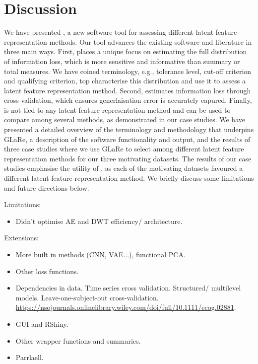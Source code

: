 \section{Discussion}\label{sec:discussion}

We have presented , a new software tool for assessing different latent feature representation methods.
Our tool advances the existing software and literature in three main ways.
First,  places a unique focus on estimating the full distribution of information loss, which is more sensitive and informative than summary or total measures.
We have coined terminology, e.g., tolerance level, cut-off criterion and qualifying criterion, top characterise this distribution and use it to assess a latent feature representation method.
Second,  estimates information loss through cross-validation, which ensures generlaisation error is accurately capured.
Finally,  is not tied to any latent feature representation method and can be used to compare among several methods, as demonstrated in our case studies.
We have presented a detailed overview of the terminology and methodology that underpins GLaRe, a description of the software functionality and output, and the results of three case studies where we use GLaRe to select among different latent feature representation methods for our three motivating datasets. 
The results of our case studies emphasise the utility of , as each of the motivating datasets favoured a different latent feature representation method.
We briefly discuss some limitations and future directions below.


Limitations:
\begin{itemize}
    \item Didn't optimise AE and DWT efficiency/ architecture.
\end{itemize}

Extensions:
\begin{itemize}
    \item More built in methods (CNN, VAE...), functional PCA.
    \item Other loss functions.
    \item Dependencies in data. Time series cross validation. Structured/ multilevel models. Leave-one-subject-out cross-validation. \url{https://nsojournals.onlinelibrary.wiley.com/doi/full/10.1111/ecog.02881}.
    \item GUI and RShiny.
    \item Other wrapper functions and summaries.
    \item Parrlaell.
\end{itemize}